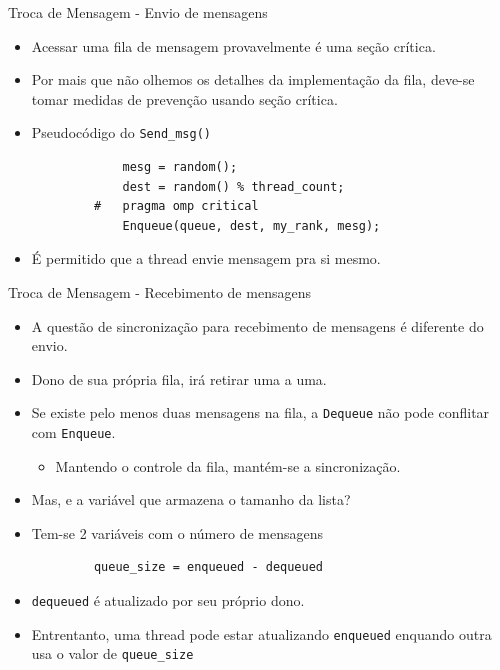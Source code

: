 	\begin{frame}[fragile]{Troca de Mensagem -  Envio de mensagens}
		\begin{itemize}
			\item Acessar uma fila de mensagem provavelmente é uma seção crítica.
			\item Por mais que não olhemos os detalhes da implementação da fila, deve-se tomar medidas de prevenção usando seção crítica.
			\item Pseudocódigo do {\tt Send\_msg()}
		\end{itemize}
		\begin{verbatim}
				mesg = random();
				dest = random() % thread_count;
			#	pragma omp critical
				Enqueue(queue, dest, my_rank, mesg);
		\end{verbatim}
		\begin{itemize}
			\item É permitido que a thread envie mensagem pra si mesmo.
		\end{itemize}
\end{frame}
	\begin{frame}[fragile]{Troca de Mensagem -  Recebimento de mensagens}
		\begin{itemize}
			\item A questão de sincronização para recebimento de mensagens é diferente do envio.
			\item Dono de sua própria fila, irá retirar uma a uma.
			\item Se existe pelo menos duas mensagens na fila, a {\tt Dequeue} não pode conflitar com {\tt Enqueue}.
			\begin{itemize}
				\item Mantendo o controle da fila, mantém-se a sincronização.
			\end{itemize}
					\bigskip
			\item Mas, e a variável que armazena o tamanho da lista?
			\item Tem-se 2 variáveis com o número de mensagens
		\end{itemize}
		\begin{verbatim}
			queue_size = enqueued - dequeued
		\end{verbatim}
		\begin{itemize}
			\item {\tt dequeued} é atualizado por seu próprio dono.
			\item Entrentanto, uma thread pode estar atualizando {\tt enqueued} enquando outra usa o valor de {\tt queue\_size}
		\end{itemize}
\end{frame}

